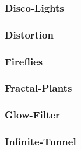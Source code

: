 \documentclass[a4paper]{article}
\begin{document}
\hypertarget{RefHeading23711167907073}{}\subsubsection{}
\clearpage\subsubsection[Disco{}-Lights]{Disco-Lights}
\hypertarget{RefHeading23731167907073}{}\subsubsection{}
\clearpage\subsubsection[Distortion]{Distortion}
\hypertarget{RefHeading23751167907073}{}\subsubsection{}
\clearpage\subsubsection[Fireflies]{Fireflies}
\hypertarget{RefHeading23771167907073}{}\subsubsection{}
\clearpage\subsubsection[Fractal{}-Plants]{Fractal-Plants}
\hypertarget{RefHeading23791167907073}{}\subsubsection{}
\clearpage\subsubsection[Glow{}-Filter]{Glow-Filter}
\hypertarget{RefHeading23811167907073}{}\subsubsection{}
\clearpage\subsubsection[Infinite{}-Tunnel]{Infinite-Tunnel}
\hypertarget{RefHeading23831167907073}{}\subsubsection{}
\end{document}
